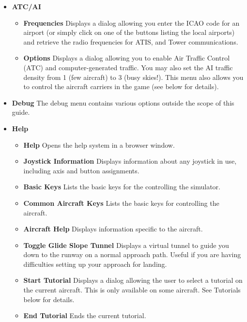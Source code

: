 \begin{itemize}
\item \textbf{ATC/AI}
 \begin{itemize}
  \item \textbf{Frequencies}  Displays a dialog allowing you enter the ICAO code
for an airport
  (or simply click on one of the buttons listing the local airports) and
retrieve the radio
  frequencies for ATIS, and Tower communications.
  \item \textbf{Options}  Displays a dialog allowing you to enable Air Traffic
Control (ATC) and
  computer-generated traffic. You may also set the AI traffic density from 1
(few aircraft) to 3 (busy skies!).
  This menu also allows you to control the aircraft carriers in the game (see
below for details).
 \end{itemize}

\item \textbf{Debug} The debug menu contains various options
outside the scope of this guide.

 \item \textbf{Help}
 \begin{itemize}
 \item \textbf{Help} Opens the help system in a browser window.
 \item \textbf{Joystick Information} Displays information about any joystick
 in use, including axis and button assignments.
 \item \textbf{Basic Keys} Lists the basic keys for the controlling the
simulator.
 \item \textbf{Common Aircraft Keys} Lists the basic keys for controlling the
aircraft.
 \item \textbf{Aircraft Help} Displays information specific to the aircraft.
 \item \textbf{Toggle Glide Slope Tunnel} Displays a virtual tunnel to guide
 you down to the runway on a normal approach path. Useful if you are having
 difficulties setting up your approach for landing.
 \item \textbf{Start Tutorial} Displays a dialog allowing the user to select a
tutorial on the current aircraft.
 This is only available on some aircraft. See Tutorials below for details.
 \item \textbf{End Tutorial}  Ends the current tutorial.
 \end{itemize}
\end{itemize}

